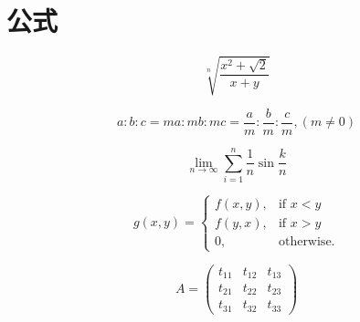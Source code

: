 
\section{公式}
\begin{equation}
   \sqrt[n]{\frac{x^2+\sqrt 2}{x+y}}
\end{equation}

\begin{equation}
   a:b:c = ma : mb: mc = \frac{a}{m} : \frac{b}{m} : \frac{c}{m} , (m \neq 0)
\end{equation}

\begin{equation}
\lim_{n \to \infty}\sum_{i=1}^n{\frac{1}{n}}\sin\frac{k}{n}
\end{equation}

\begin{equation}
   g(x,y) = \left\{\begin{array}{ll}
      f(x,y), & \mbox{if $x<y$} \\  %
      f(y,x), & \mbox{if $x>y$} \\  %
      0,      & \mbox{otherwise.}
     \end{array} \right.
\end{equation}

\begin{equation}
   A =\begin{pmatrix}                %
  t_{11} & t_{12} & t_{13} \\
  t_{21} & t_{22} & t_{23} \\
  t_{31} & t_{32} & t_{33}
   \end{pmatrix}
\end{equation}
\vspace*{3em}

